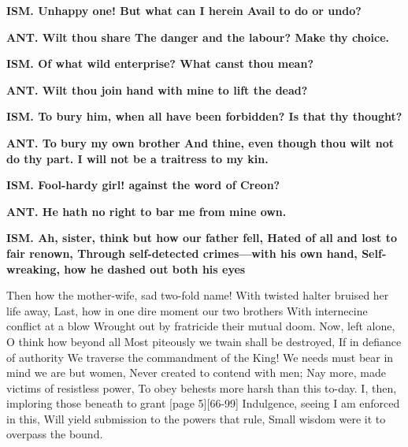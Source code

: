 \documentclass[11pt,letter]{book}
\begin{document}
\par \textbf{ISM. Unhappy one! But what can I herein Avail to do or undo?}
\par 

\par \textbf{ANT. Wilt thou share The danger and the labour? Make thy choice.}
\par 

\par \textbf{ISM. Of what wild enterprise? What canst thou mean?}
\par 

\par \textbf{ANT. Wilt thou join hand with mine to lift the dead?}
\par 

\par \textbf{ISM. To bury him, when all have been forbidden? Is that thy thought?}
\par 

\par \textbf{ANT. To bury my own brother And thine, even though thou wilt not do thy part. I will not be a traitress to my kin.}
\par 

\par \textbf{ISM. Fool-hardy girl! against the word of Creon?}
\par 

\par \textbf{ANT. He hath no right to bar me from mine own.}
\par 

\par \textbf{ISM. Ah, sister, think but how our father fell, Hated of all and lost to fair renown, Through self-detected crimes—with his own hand, Self-wreaking, how he dashed out both his eyes}
\par   Then how the mother-wife, sad two-fold name! With twisted halter bruised her life away, Last, how in one dire moment our two brothers With internecine conflict at a blow Wrought out by fratricide their mutual doom. Now, left alone, O think how beyond all Most piteously we twain shall be destroyed, If in defiance of authority We traverse the commandment of the King! We needs must bear in mind we are but women, Never created to contend with men; Nay more, made victims of resistless power, To obey behests more harsh than this to-day. I, then, imploring those beneath to grant [page 5][66-99] Indulgence, seeing I am enforced in this, Will yield submission to the powers that rule, Small wisdom were it to overpass the bound.
\end{document}
